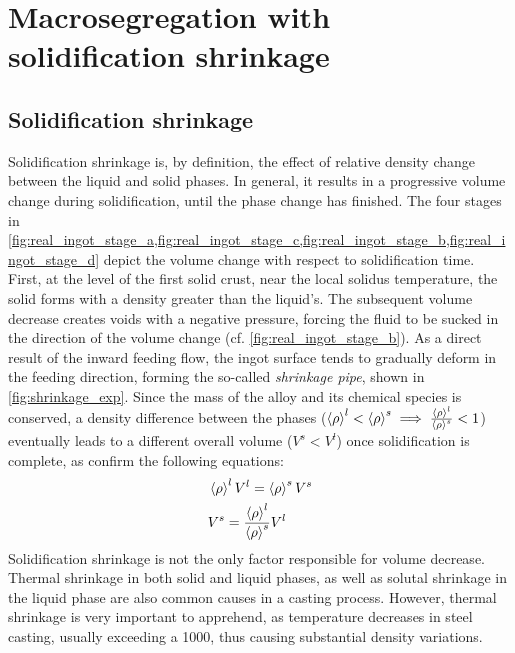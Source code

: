 \chapter{Macrosegregation with solidification shrinkage}
\begin{nolinkcolors} 
\minitoc
\end{nolinkcolors}
\newpage

\section{Solidification shrinkage}

Solidification shrinkage is, by definition, the effect of relative density change between the liquid and solid phases.
In general, it results in a progressive volume change during solidification, until the phase change has finished. 
The four stages in \cref{fig:real_ingot_stage_a,fig:real_ingot_stage_c,fig:real_ingot_stage_b,fig:real_ingot_stage_d} depict the volume change with 
respect to solidification time.
First, at the level of the first solid crust, near the local solidus temperature, the solid forms with a density greater than 
the liquid's. The subsequent volume decrease creates voids with a negative pressure, forcing the fluid to be sucked in the direction of the volume change 
(cf. \cref{fig:real_ingot_stage_b}). As a direct result of the inward feeding flow, the ingot surface
tends to gradually deform in the feeding direction, forming the so-called \emph{shrinkage pipe}, shown in \cref{fig:shrinkage_exp}. 
Since the mass of the alloy and its chemical species is conserved, 
a density difference between the phases ($\left \langle \rho \right \rangle^l < \left \langle \rho \right \rangle^s \implies \frac{\left \langle \rho \right \rangle^l}{\left \langle \rho \right \rangle^s}<1$) eventually leads 
to a different overall volume ($V^s<V^l$) once solidification is complete, as confirm the following equations:
\begin{subequations}
\begin{align}
& \left \langle \rho \right \rangle^l V^l = \left \langle \rho \right \rangle^s V^s  \\ 
& V^s = \frac{\left \langle \rho \right \rangle^l}{\left \langle \rho \right \rangle^s} V^l
\end{align}
\end{subequations}
Solidification shrinkage is not the only factor responsible for volume decrease. 
Thermal shrinkage in both solid and liquid phases, as well 
as solutal shrinkage in the liquid phase are also common causes in a casting process. 
However, thermal shrinkage is very important to apprehend, as temperature decreases in steel casting, usually exceeding a \SI{1000}{\udegC}, thus causing substantial density variations. 
